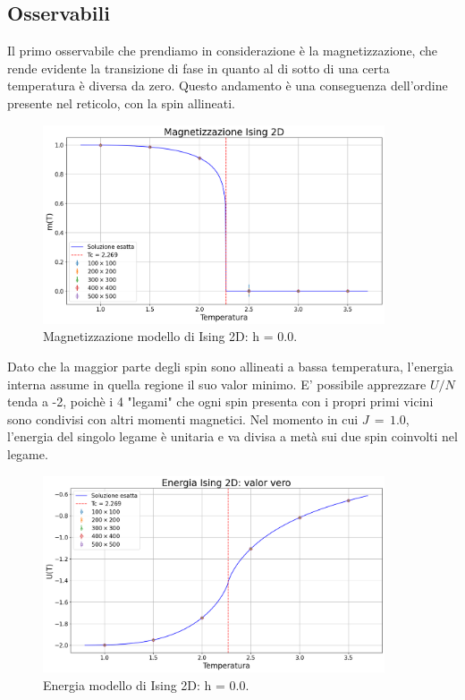 \subsection{Osservabili}

Il primo osservabile che prendiamo in considerazione è la magnetizzazione, che rende evidente la transizione di fase in quanto al di 
sotto di una certa temperatura è diversa da zero. Questo andamento è una conseguenza dell'ordine presente nel reticolo, con la spin allineati. 

\begin{figure}[H]
    \centering
    \includegraphics[width=0.9\textwidth]{Immagini/simIsing2D/magn.png}
    \caption{Magnetizzazione modello di Ising 2D: h = 0.0.}
    \label{fig: magn_Ising2D}
\end{figure}

Dato che la maggior parte degli spin sono allineati a bassa temperatura, l'energia interna assume in quella regione il suo valor minimo. 
E' possibile apprezzare $U/N$ tenda a -2, poichè i 4 "legami" che ogni spin presenta con i propri primi vicini sono condivisi con altri 
momenti magnetici. Nel momento in cui $J\,=\,1.0$, l'energia del singolo legame è unitaria e va divisa a metà sui due spin coinvolti nel 
legame.

\begin{figure}[H]
    \centering
    \includegraphics[width=0.9\textwidth]{Immagini/simIsing2D/ene.png}
    \caption{Energia modello di Ising 2D: h = 0.0.}
    \label{fig: ene_Ising2D}
\end{figure}





